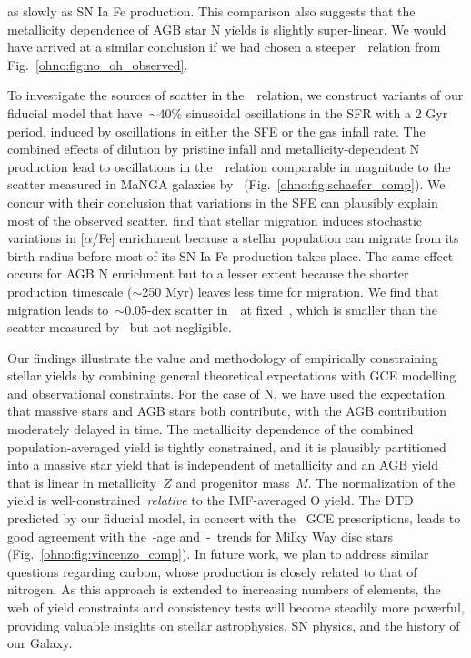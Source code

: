 as slowly as SN Ia Fe production.
This comparison also suggests that the metallicity dependence of
AGB star N yields is slightly super-linear.
We would have arrived at a similar conclusion if we had chosen a
steeper~\ohno~relation from Fig.~\ref{ohno:fig:no_oh_observed}.
\par
To investigate the sources of scatter in the~\ohno~relation, we construct
variants of our fiducial model that have~$\sim$40\% sinusoidal oscillations in
the SFR with a 2 Gyr period, induced by oscillations in either the SFE or the
gas infall rate.
The combined effects of dilution by pristine infall and metallicity-dependent N
production lead to oscillations in the~\ohno~relation comparable in magnitude
to the scatter measured in MaNGA galaxies by~\citet{Schaefer2020}
(Fig.~\ref{ohno:fig:schaefer_comp}).
We concur with their conclusion that variations in the SFE can plausibly
explain most of the observed scatter.
\citet{Johnson2021} find that stellar migration induces stochastic variations
in [$\alpha$/Fe] enrichment because a stellar population can migrate from its
birth radius before most of its SN Ia Fe production takes place.
The same effect occurs for AGB N enrichment but to a lesser extent because the
shorter production timescale ($\sim$250 Myr) leaves less time for migration.
We find that migration leads to~$\sim$0.05-dex scatter in~\no~at fixed~\oh,
which is smaller than the scatter measured by~\citet{Schaefer2020} but not
negligible.
\par
Our findings illustrate the value and methodology of empirically constraining
stellar yields by combining general theoretical expectations with GCE modelling
and observational constraints.
For the case of N, we have used the expectation that massive stars and AGB stars
both contribute, with the AGB contribution moderately delayed in time.
The metallicity dependence of the combined population-averaged yield is tightly
constrained, and it is plausibly partitioned into a massive star yield that is
independent of metallicity and an AGB yield that is linear in metallicity~$Z$
and progenitor mass~$M$.
The normalization of the yield is well-constrained~\textit{relative} to the
IMF-averaged O yield.
The DTD predicted by our fiducial model, in concert with the~\citet{Johnson2021}
GCE prescriptions, leads to good agreement with the~\no-age and~\no-\ofe~trends
for Milky Way disc stars (Fig.~\ref{ohno:fig:vincenzo_comp}).
In future work, we plan to address similar questions regarding carbon, whose
production is closely related to that of nitrogen.
As this approach is extended to increasing numbers of elements, the web of
yield constraints and consistency tests will become steadily more powerful,
providing valuable insights on stellar astrophysics, SN physics, and the
history of our Galaxy.


